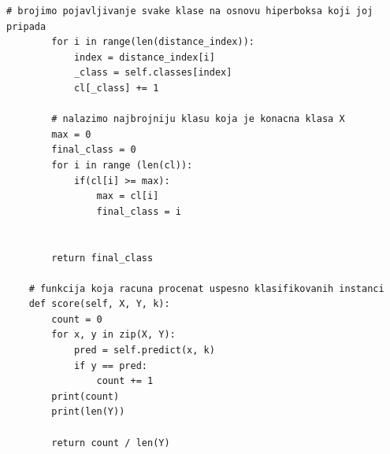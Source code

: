 \documentclass[a4paper]{article}
\begin{document}
\begin{lstlisting}[caption={Klasa koja predstavlja Fazi Min Max klasifikator koji koristi KNN},frame=single, label=particle]
        # brojimo pojavljivanje svake klase na osnovu hiperboksa koji joj pripada
        for i in range(len(distance_index)):
            index = distance_index[i]
            _class = self.classes[index]
            cl[_class] += 1
        
        # nalazimo najbrojniju klasu koja je konacna klasa X
        max = 0
        final_class = 0
        for i in range (len(cl)):
            if(cl[i] >= max):
                max = cl[i]
                final_class = i
        
        
        return final_class
       
    # funkcija koja racuna procenat uspesno klasifikovanih instanci
    def score(self, X, Y, k):
        count = 0
        for x, y in zip(X, Y):
            pred = self.predict(x, k)
            if y == pred:
                count += 1
        print(count)
        print(len(Y))
        
        return count / len(Y)

\end{lstlisting}
\end{document}
